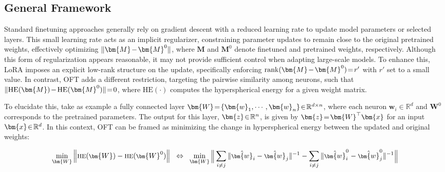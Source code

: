 \subsection{General Framework}

Standard finetuning approaches generally rely on gradient descent with a reduced learning rate to update model parameters or selected layers. This small learning rate acts as an implicit regularizer, constraining parameter updates to remain close to the original pretrained weights, effectively optimizing $\thickmuskip=2mu \medmuskip=2mu \| \bm{M} - \bm{M}^0\|$, where $\bm{M}$ and $\bm{M}^0$ denote finetuned and pretrained weights, respectively. Although this form of regularization appears reasonable, it may not provide sufficient control when adapting large-scale models. To enhance this, LoRA imposes an explicit low-rank structure on the update, specifically enforcing $\thickmuskip=2mu \medmuskip=2mu \text{rank}(\bm{M} - \bm{M}^0)=r'$ with $r'$ set to a small value. In contrast, OFT adds a different restriction, targeting the pairwise similarity among neurons, such that $\thickmuskip=2mu \medmuskip=2mu \| \text{HE}(\bm{M})-\text{HE}(\bm{M}^0) \|=0$, where $\text{HE}(\cdot)$ computes the hyperspherical energy for a given weight matrix.

To elucidate this, take as example a fully connected layer $\thickmuskip=2mu \medmuskip=2mu \bm{W}=\{\bm{w}_1,\cdots,\bm{w}_n\}\in\mathbb{R}^{d\times n}$, where each neuron $\bm{w}_i\in\mathbb{R}^{d}$ and $\bm{W}^0$ corresponds to the pretrained parameters. The output for this layer, $\thickmuskip=2mu \medmuskip=2mu \bm{z}\in\mathbb{R}^n$, is given by $\thickmuskip=2mu \medmuskip=2mu \bm{z}=\bm{W}^\top\bm{x}$ for an input $\thickmuskip=2mu \medmuskip=2mu \bm{x}\in\mathbb{R}^d$. In this context, OFT can be framed as minimizing the change in hyperspherical energy between the updated and original weights:

\begin{equation}\label{eq:oft_principle}
\footnotesize
\min_{\bm{W}} \left\| \text{HE}(\bm{W})-\text{HE}(\bm{W}^0)\right\|~~\Leftrightarrow~~\min_{\bm{W}} \bigg{\|} \sum_{i\neq j} \|\hat{\bm{w}}_i-\hat{\bm{w}}_j\|^{-1}-\sum_{i\neq j} \|\hat{\bm{w}}^0_i-\hat{\bm{w}}^0_j\|^{-1}\bigg{\|}
\end{equation}

